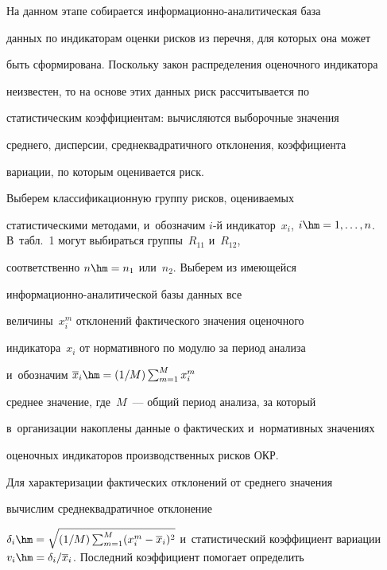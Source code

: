      На данном этапе собирается информационно-аналитическая база 


данных по индикаторам оценки рисков из перечня, для которых она может 


быть сформирована. Поскольку закон распределения оценочного индикатора 


неизвестен, то на основе этих данных риск рассчитывается по 


статистическим коэффициентам: вычисляются выборочные значения 


среднего, дисперсии, среднеквадратичного отклонения, коэффициента 


вариации, по которым оценивается риск.


     


     Выберем классификационную группу рисков, оцениваемых 


статистическими методами, и~обозначим $i$-й индикатор~$x_i$, $i\hm=1, 


\ldots ,n$. В~табл.~1 могут выбираться группы~$R_{11}$ и~$R_{12}$, 


соответственно $n\hm=n_1$ или~$n_2$. Выберем из име\-ющей\-ся  


ин\-фор\-ма\-ци\-он\-но-ана\-ли\-ти\-че\-ской базы данных все 


величины~$x_i^m$ отклонений фактического значения оценочного 


индикатора~$x_i$ от нормативного по модулю за период анализа 


и~обозначим $\overline{x}_i\hm= (1/M) \sum\nolimits^M_{m=1} x_i^m$ 


среднее значение, где~$M$~--- общий период анализа, за который 


в~организации накоплены данные о фактических и~нормативных значениях 


оценочных индикаторов производственных рисков ОКР.


     


     Для характеризации фактических отклонений от среднего значения 


вы\-чис\-лим среднеквадратичное отклонение 


     $


     \delta_i\hm= \sqrt{(1/M) \sum\nolimits^M_{m=1} (x_i^m -


\overline{x}_i)^2}$ и~статистический коэффициент вариации $v_i\hm= 


\delta_i/\overline{x}_i$. Последний коэффициент помогает определить 



